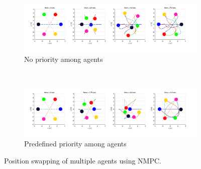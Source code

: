 \begin{figure}
    \centering
    \begin{subfigure}[b]{\textwidth}
        \includegraphics[width=\textwidth]{./images/collision_nmpc_1}
        \caption{No priority among agents}
        \label{fig:coll_nmpc1}
    \end{subfigure}
    \\ %
    \begin{subfigure}[b]{\textwidth}
        \includegraphics[width=\textwidth]{./images/collision_nmpc_2}
        \caption{Predefined priority among agents}
        \label{fig:coll_nmpc2}
    \end{subfigure}
    \caption[Position swapping of multiple agents using NMPC]{Position swapping of multiple agents using NMPC. \cite{kamel2017robust} }\label{fig:coll_nmpc}
\end{figure}

